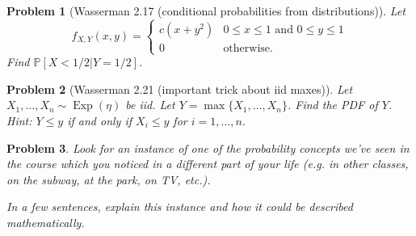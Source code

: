 \documentclass{article}
\newtheorem{problem}{Problem}
\newcommand{\PP}{\mathbb{P}}
\begin{document}
\begin{problem}[Wasserman 2.17 (conditional probabilities from distributions)]
Let
    \begin{equation*}
        f_{X,Y}(x,y) 
        = 
        \begin{cases}
            c(x+y^2) & 0\leq x\leq 1 \text{ and } 0\leq y \leq 1 \\
            0 & \text{otherwise.}
        \end{cases}
    \end{equation*}
    Find $\PP[X<1/2 | Y = 1/2]$.
\end{problem}

\begin{problem}[Wasserman 2.21 (important trick about iid maxes)]
    Let $X_1, \ldots, X_n\sim\operatorname{Exp}(\eta)$ be iid. Let $Y=\max\{X_1, \ldots, X_n\}$. Find the PDF of $Y$. Hint: $Y\leq y$ if and only if $X_i \leq y$ for $i=1,\ldots, n$.
\end{problem}

\begin{problem}
    Look for an instance of one of the probability concepts we've seen in the course which you noticed in a different part of your life (e.g. in other classes, on the subway, at the park, on TV, etc.).

    In a few sentences, explain this instance and how it could be described mathematically.
\end{problem}
\end{document}
